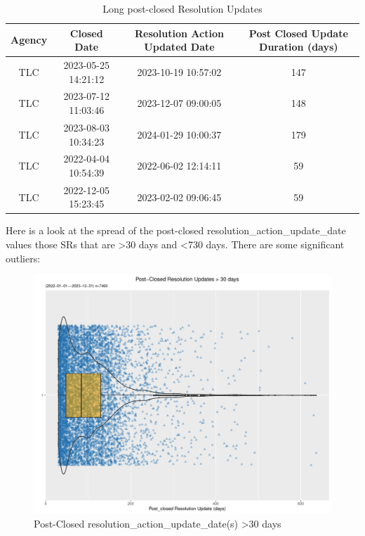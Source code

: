 \documentclass[12pt, titlepage]{article}
\begin{document}
{	\begin{table}[tbp]
    \centering
    \normalsize
     \caption{Long post-closed Resolution Updates}
    \begin{tabular}{cccc}
	        \hline
	        Agency & Closed Date & Resolution Action Updated Date 
	        & Post Closed Update Duration (days) \\
	        \hline
	        TLC & 2023-05-25 14:21:12 & 2023-10-19 10:57:02 & 147 \\
	        TLC & 2023-07-12 11:03:46 & 2023-12-07 09:00:05 & 148 \\
	        TLC & 2023-08-03 10:34:23 & 2024-01-29 10:00:37 & 179 \\
	        TLC & 2022-04-04 10:54:39 & 2022-06-02 12:14:11 & 59 \\
	        TLC & 2022-12-05 15:23:45 & 2023-02-02 09:06:45 & 59 \\
	        \hline
	    \end{tabular}
    \label{tab:resolution}
	\end{table}

	Here is a look at the spread of the post-closed resolution\_action\_update\_date 
	values those SRs 	that are \textgreater30 days and \textless{}730 days. 
	There are some significant outliers: 
	
	\begin{figure}[tbp]
		\centering
		\includegraphics[width = \textwidth]{post_closed_violin.pdf}
		\caption{Post-Closed resolution\_action\_update\_date(s) 
		\textgreater30 days}
		\label{fig:resolution-violin}
	\end{figure}		

}
\end{document}

